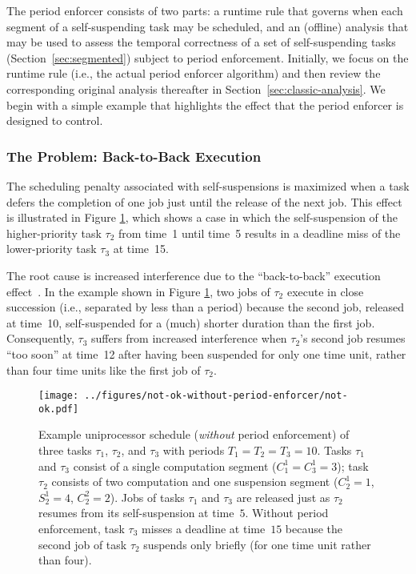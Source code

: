 The period enforcer consists of two parts: a runtime rule that governs when each segment of a self-suspending task may be scheduled, and an (offline) analysis that may be used to assess the temporal correctness of a set of self-suspending tasks (Section~\ref{sec:segmented}) subject to period enforcement. Initially, we focus on the runtime rule (i.e., the actual period enforcer algorithm) and then review the corresponding original analysis thereafter in Section~\ref{sec:classic-analysis}.  We begin with a simple example that highlights the effect that the period enforcer is designed to control.
 


\subsubsection{The Problem: Back-to-Back Execution}

The scheduling penalty associated with self-suspensions is maximized when a task defers the completion of one job just until the release of the next job.  This effect is illustrated in Figure \ref{fig:not-ok-without-period-enforcement}, which shows a case in which the self-suspension of the higher-priority task $\tau_2$ from time~1 until time~5  results in a deadline miss of the lower-priority task $\tau_3$ at time~15.

The root cause is increased interference due to the ``back-to-back'' execution effect~\cite{LSS:87,LSST:91,Ra:90,ABRTW:93,SLS:95}. In the example shown in Figure \ref{fig:not-ok-without-period-enforcement}, two jobs of $\tau_2$ execute in close succession (i.e., separated by less than a period) because the second job, released at time~10, self-suspended for a (much) shorter duration than the first job.  Consequently,  $\tau_3$ suffers from increased interference when $\tau_2$'s second job resumes ``too soon'' at time~12 after having been suspended for only one time unit, rather than four time units like the first job of $\tau_2$. 

\begin{figure}[t]
  \centering
  \texttt{[image: ../figures/not-ok-without-period-enforcer/not-ok.pdf]}
  \caption{Example uniprocessor schedule (\emph{without} period enforcement) of three tasks $\tau_1$, $\tau_2$, and $\tau_3$ with periods $T_1 = T_2 = T_3 = 10$. Tasks $\tau_1$ and $\tau_3$ consist of a single computation segment ($C_1^1 = C_3^1 = 3$); task $\tau_2$ consists of two computation and one suspension segment ($C_2^1 = 1$, $S_2^1 = 4$, $C_2^2 = 2$). Jobs of tasks $\tau_1$ and $\tau_3$ are released just as $\tau_2$ resumes from its self-suspension at time~$5$. Without period enforcement, task $\tau_3$ misses a deadline at time~$15$ because the second job of  task $\tau_2$ suspends only briefly (for one time unit rather than four).}
  \label{fig:not-ok-without-period-enforcement}
\end{figure}

